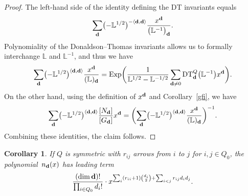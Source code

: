 \documentclass[10pt,a4paper]{amsart}
\numberwithin{equation}{section}
\newtheorem{Corollary}[Theorem]{Corollary}
\theoremstyle{definition}
\begin{document}
\begin{proof} The left-hand side of the identity defining the DT invariants equals
\[\sum_{\bf d}\bigl(-\mathbb{L}^{1/2}\bigr)^{-\langle{\bf d},{\bf d}\rangle}\frac{x^{\bf d}}{\bigl(\mathbb{L}^{-1}\bigr)_{\bf d}}.\]
Polynomiality of the Donaldson--Thomas invariants allows us to formally interchange $\mathbb{L}$ and $\mathbb{L}^{-1}$, and thus we have
\[\sum_{\bf d}\bigl(-\mathbb{L}^{1/2}\bigr)^{\langle{\bf d},{\bf d}\rangle}\frac{x^{\bf d}}{(\mathbb{L})_{\bf d}}=\operatorname{Exp}\biggl(\frac{1}{\mathbb{L}^{1/2}-\mathbb{L}^{-1/2}}\sum_{{\bf d}\not=0}{\rm DT}^Q_{\bf d}\bigl(\mathbb{L}^{-1}\bigr)x^{\bf d}\biggr).\]
On the other hand, using the definition of $x^{\bf d}$ and Corollary~\ref{gfi}, we have
\[\sum_\mathbf{d}\bigl(-\mathbb{L}^{1/2}\bigr)^{\langle\mathbf{d},\mathbf{d}\rangle} \frac{[N_\mathbf{d}]}{[G_\mathbf{d}]}x^\mathbf{d}=\biggl(\sum_{\bf d}\bigl(-\mathbb{L}^{1/2}\bigr)^{\langle{\bf d},{\bf d}\rangle}\frac{x^{\bf d}}{(\mathbb{L})_{\bf d}}\biggr)^{-1}.\]
Combining these identities, the claim follows.\end{proof}

\begin{Corollary} If $Q$ is symmetric with $r_{ij}$ arrows from $i$ to $j$ for $i,j\in Q_0$, the polynomial~$n_{\bf d}(x)$ has leading term
\[\frac{(\dim {\bf d})!}{\prod_{i\in Q_0}d_i!}\cdot x^{\sum_{i}(r_{ii}+1){d_i\choose 2}+\sum_{i<j}r_{ij}d_id_j}.\]
\end{Corollary}
\end{document}
